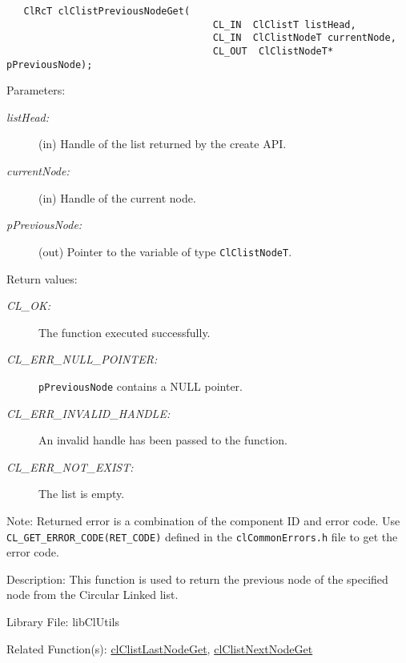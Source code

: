 \begin{flushleft}
\begin{Desc}
\footnotesize\begin{verbatim}   ClRcT clClistPreviousNodeGet(
                             		CL_IN  ClClistT listHead,
                             		CL_IN  ClClistNodeT currentNode,
                             		CL_OUT  ClClistNodeT* pPreviousNode);
\end{verbatim}
\normalsize
\end{Desc}
\begin{Desc}
\item[Parameters:]
\begin{description}
\item[{\em list\-Head:}](in) Handle of the list returned by the create API. \item[{\em current\-Node:}](in) Handle of the current node. 
\item[{\em p\-Previous\-Node:}](out) Pointer to the variable of type {\tt{Cl\-Clist\-Node\-T}}.\end{description}
\end{Desc}
\begin{Desc}
\item[Return values:]
\begin{description}
\item[{\em CL\_\-OK:}]The function executed successfully. \item[{\em CL\_\-ERR\_\-NULL\_\-POINTER:}]{\tt{pPreviousNode}} contains a NULL pointer. 
\item[{\em CL\_\-ERR\_\-INVALID\_\-HANDLE:}]An invalid handle has been passed to the function. 
\item[{\em CL\_\-ERR\_\-NOT\_\-EXIST:}]The list is empty.\end{description}
\end{Desc}
\begin{Desc}
\item[Note:]Returned error is a combination of the component ID and error code. Use {\tt{CL\_\-GET\_\-ERROR\_\-CODE(RET\_\-CODE)}} defined in 
the {\tt{clCommonErrors.h}} file to get the error code.\end{Desc}
\begin{Desc}
\item[Description:]This function is used to return the previous node of the specified node from the Circular Linked list.\end{Desc}
\begin{Desc}
\item[Library File:]lib\-Cl\-Utils\end{Desc}
\begin{Desc}
\item[Related Function(s):]\hyperlink{pagecl108}{cl\-Clist\-Last\-Node\-Get}, \hyperlink{pagecl109}{cl\-Clist\-Next\-Node\-Get} \end{Desc}
\newpage


\end{flushleft}
